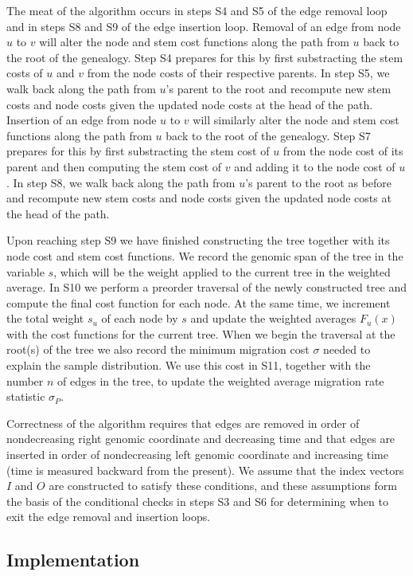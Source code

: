 The meat of the algorithm occurs in steps S4 and S5 of the edge removal loop
and in steps S8 and S9 of the edge insertion loop. Removal of an edge from
node $u$ to $v$ will alter the node and stem cost functions along the path from
$u$ back to the root of the genealogy. Step S4 prepares for this by first
substracting the stem costs of $u$ and $v$ from the node costs of their
respective parents. In step S5, we walk back along the path from $u$'s parent to
the root and recompute new stem costs and node costs given the updated node
costs at the head of the path. Insertion of an edge from node $u$ to $v$ will 
similarly alter the node and stem cost functions along the path from
$u$ back to the root of the genealogy. Step S7 prepares for this by first
substracting the stem cost of $u$ from the node cost of its parent and then
computing the stem cost of $v$ and adding it to the node cost of $u$. In step 
S8, we walk back along the path from $u$'s parent to the root as before and 
recompute new stem costs and node costs given the updated node costs at the 
head of the path.

Upon reaching step S9 we have finished constructing the tree together with its
node cost and stem cost functions. We record the genomic span of the tree in the 
variable $s$, which will be the weight applied to the current tree in the weighted
average. In S10 we perform a preorder traversal of the newly constructed tree
and compute the final cost function for each node. At the same time, we 
increment the total weight $s_u$ of each node by $s$ and update the weighted 
averages $F_u(x)$ with the cost functions for the current tree. When we begin
the traversal at the root(s) of the tree we also record the minimum migration 
cost $\sigma$ needed to explain the sample distribution. We use this cost in
S11, together with the number $n$ of edges in the tree, to update the weighted
average migration rate statistic $\sigma_P$.

Correctness of the algorithm requires that edges are removed in order of 
nondecreasing right genomic coordinate and decreasing time and that edges are
inserted in order of nondecreasing left genomic coordinate and increasing time
(time is measured backward from the present). We assume that the index vectors
$I$ and $O$ are constructed to satisfy these conditions, and these assumptions 
form the basis of the conditional checks in steps S3 and S6 for determining
when to exit the edge removal and insertion loops.

\subsection{Implementation}

